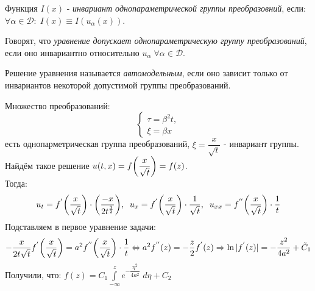 \begin{definition}
Функция $I(x)$ - \textit{инвариант однопараметрической группы преобразовний}, если: $\forall \alpha \in \mathcal{D}\colon\; I(x) \equiv I(u_{\alpha}(x))$.
\end{definition}
\begin{definition}
Говорят, что \textit{уравнение допускает однопараметрическую группу преобразований}, если оно инвариантно относительно $u_{\alpha}\; \forall \alpha \in \mathcal{D}$.
\end{definition}
\begin{definition}
Решение уравнения называется \textit{автомодельным}, если оно зависит только от инвариантов некоторой допустимой группы преобразований.
\end{definition}
Множество преобразований:
\begin{equation*}
\begin{cases}
	\tau = \beta^2 t, \\
	\xi = \beta x
\end{cases}
\end{equation*}
есть однопарметрическая группа преобразований, $\xi = \dfrac{x}{\sqrt{t}} $ - инвариант группы. \\
Найдём такое решение $u(t, x) = f\biggl(\dfrac{x}{\sqrt{t}}\biggr) = f(z)$. \\
Тогда:
\begin{equation*}
	u_t = f^{'}\biggl(\dfrac{x}{\sqrt{t}}\biggr) \cdot \biggl(\dfrac{-x}{2t^{\frac{3}{2}}}\biggr), \; \; u_x = f^{'}\biggl(\dfrac{x}{\sqrt{t}}\biggr) \cdot \dfrac{1}{\sqrt{t}},\; \; u_{xx} = f^{''}\biggl(\dfrac{x}{\sqrt{t}}\biggr) \cdot \dfrac{1}{t}
\end{equation*}
Подставляем в первое уравнение задачи:
\begin{equation*}
	-\dfrac{x}{2t\sqrt{t}} f^{'}\biggl(\dfrac{x}{\sqrt{t}}\biggr) = a^2 f^{''}\biggl(\dfrac{x}{\sqrt{t}}\biggr) \cdot \dfrac{1}{t} \Leftrightarrow a^2f^{''}(z) = -\dfrac{z}{2}f^{'}(z) \Rightarrow \ln|f^{'}(z)| = -\dfrac{z^2}{4a^2} + \tilde{C}_1
\end{equation*}
Получили, что: $f(z) = C_1 \displaystyle\int\limits_{-\infty}^z e^{-\dfrac{\eta^2}{4a^2}}\;d\eta + C_2$
